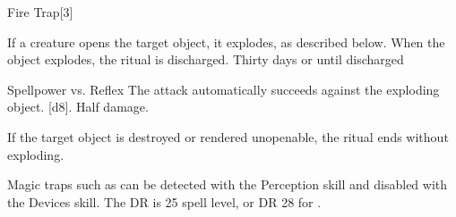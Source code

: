 \begin{spellsection}{Fire Trap}[3]
    \begin{spellheader}
    \end{spellheader}
    \begin{spellcontent}
        \begin{spelltargetinginfo}
            \spellrng{\rngtouch}
        \end{spelltargetinginfo}
        \begin{spelleffects}
            \spelleffect If a creature opens the target object, it explodes, as described below. When the object explodes, the ritual is discharged.
            \spelldur Thirty days or until discharged \dismissable
        \end{spelleffects}
    \end{spellcontent}
    \begin{spellsubcontent}
        \begin{spelltargetinginfo}
        \end{spelltargetinginfo}
        \begin{spelleffects}
            \begin{spellattack}{Spellpower vs. Reflex}
                \spellspecial The attack automatically succeeds against the exploding object.
                \spellsuccess {}[d8].
                \spellfailure Half damage.
            \end{spellattack}
        \end{spelleffects}
    \end{spellsubcontent}
    \begin{spellfooter}
        \spellnotes If the target object is destroyed or rendered unopenable, the ritual ends without exploding.

        \par Magic traps such as  can be detected with the Perception skill and disabled with the Devices skill. The DR is 25 \add spell level, or DR 28 for .
    \end{spellfooter}
    \begin{spellaugments}
    \end{spellaugments}
\end{spellsection}

